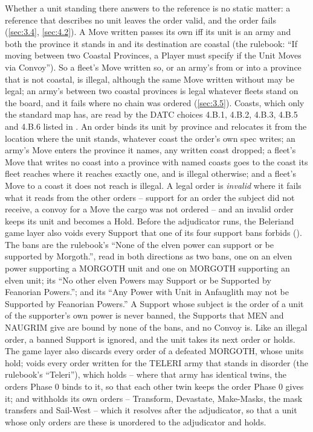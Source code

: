 \documentclass[12pt,a4paper]{article}
\begin{document}
Whether a unit standing there answers to the reference is no static matter: a reference that describes no unit leaves the order valid, and the order fails (\cref{sec:3.4}, \cref{sec:4.2}).
A Move written  passes its own iff its unit is an army and both the province it stands in and its destination are coastal (the rulebook: ``If moving between two Coastal Provinces, a Player must specify if the Unit Moves via Convoy'').
So a fleet's Move written so, or an army's from or into a province that is not coastal, is illegal, although the same Move written without  may be legal; an army's between two coastal provinces is legal whatever fleets stand on the board, and it fails where no chain was ordered (\cref{sec:3.5}).
Coasts, which only the standard map has, are read by the DATC choices 4.B.1, 4.B.2, 4.B.3, 4.B.5 and 4.B.6 listed in .
An order binds its unit by province and relocates it from the location where the unit stands, whatever coast the order's own spec writes; an army's Move enters the province it names, any written coast dropped; a fleet's Move that writes no coast into a province with named coasts goes to the coast its fleet reaches where it reaches exactly one, and is illegal otherwise; and a fleet's Move to a coast it does not reach is illegal.
A legal order is \emph{invalid} where it fails what it reads from the other orders -- support for an order the subject did not receive, a convoy for a Move the cargo was not ordered -- and an invalid order keeps its unit and becomes a Hold.
Before the adjudicator runs, the Beleriand game layer also voids every Support that one of its four support bans forbids ().
The bans are the rulebook's ``None of the elven power can support or be supported by Morgoth.'', read in both directions as two bans, one on an elven power supporting a MORGOTH unit and one on MORGOTH supporting an elven unit; its ``No other elven Powers may Support or be Supported by Feanorian Powers.''; and its ``Any Power with Unit in Anfauglith may not be Supported by Feanorian Powers.''
A Support whose subject is the order of a unit of the supporter's own power is never banned, the Supports that MEN and NAUGRIM give are bound by none of the bans, and no Convoy is.
Like an illegal order, a banned Support is ignored, and the unit takes its next order or holds.
The game layer also discards every order of a defeated MORGOTH, whose units hold; voids every order written for the TELERI army that stands in disorder (the rulebook's ``Teleri''), which holds -- where that army has identical twins, the orders Phase 0 binds to it, so that each other twin keeps the order Phase 0 gives it; and withholds its own orders -- Transform, Devastate, Make-Masks, the mask transfers and Sail-West -- which it resolves after the adjudicator, so that a unit whose only orders are these is unordered to the adjudicator and holds.
\end{document}
